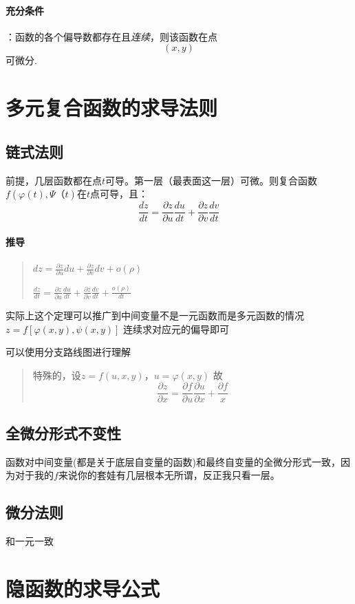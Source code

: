 \documentclass{ctexart}
\begin{document}
          \paragraph{充分条件}：函数的各个偏导数都存在且\emph{连续}，则该函数在点$$(x,y)$$可微分.
  \section{多元复合函数的求导法则}
  \subsection{链式法则}
  前提，几层函数都在点$t$可导。第一层（最表面这一层）可微。则复合函数$f(\varphi(t),\Psi（t)$在$t$点可导，且：
      $$\frac{dz}{dt} = \frac{\partial z}{\partial u}\frac{du}{dt} + \frac{\partial z}{\partial v}\frac{dv}{dt}$$
      \paragraph{推导}
        \begin{quote}
          $dz = \frac{\partial z}{\partial u}du + \frac{\partial z}{\partial v}dv + o(\rho)$

          $\frac{dz}{dt} = \frac{\partial z}{\partial u}\frac{du}{dt} + \frac{\partial z}{\partial v}\frac{dv}{dt} + \frac{o(\rho)}{dt}$

        \end{quote}
      实际上这个定理可以推广到中间变量不是一元函数而是多元函数的情况$z = f[\varphi(x,y),\psi(x,y)]$
      连续求对应元的偏导即可

      可以使用分支路线图进行理解
      \begin{quote}
        特殊的，设$z=f(u,x,y)，u=\varphi(x,y)$
        故
          $$
          \frac{\partial z}{\partial x} = \frac{\partial f}{\partial u}\frac{\partial u}{\partial x} + \frac{\partial f}{x}
          $$
      \end{quote}
  
  \subsection{全微分形式不变性}
  函数对中间变量(都是关于底层自变量的函数)和最终自变量的全微分形式一致，因为对于我的$f$来说你的套娃有几层根本无所谓，反正我只看一层。
  \subsection{微分法则}
      和一元一致
  \section{隐函数的求导公式}
\end{document}
